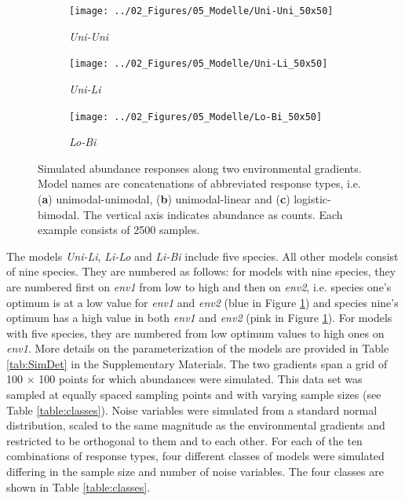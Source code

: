 	
		\begin{figure}[h!]
			
			\begin{subfigure}{0.3\textwidth}
				\centering
				\texttt{[image: ../02\_Figures/05\_Modelle/Uni-Uni\_50x50]}
				\caption{\textit{Uni-Uni}}
				\label{fig:bivariateExample1}
			\end{subfigure}
			\begin{subfigure}{0.3\textwidth}
				\centering
				\texttt{[image: ../02\_Figures/05\_Modelle/Uni-Li\_50x50]}
				\caption{\textit{Uni-Li}}
			\end{subfigure}
			\begin{subfigure}{0.3\textwidth}
				\centering
				\texttt{[image: ../02\_Figures/05\_Modelle/Lo-Bi\_50x50]}
				\caption{\textit{Lo-Bi}}
				\label{fig:bivariateExample3}
			\end{subfigure}
			\caption{Simulated abundance responses along two environmental gradients. Model names are concatenations of abbreviated response types, i.e. (\textbf{a}) unimodal-unimodal, (\textbf{b}) unimodal-linear and (\textbf{c}) logistic-bimodal. The vertical axis indicates abundance as counts.
				Each example consists of 2500 samples.}
			\label{fig:bivariateExample}
		\end{figure}
	
		
		The models \textit{Uni-Li}, \textit{Li-Lo} and \textit{Li-Bi} include five species.
		All other models consist of nine species.
		They are numbered as follows: for models with nine species, they are numbered first on \textit{env1} from low to high and then on \textit{env2}, i.e. species one's optimum is at a low value for \textit{env1} and \textit{env2} (blue in Figure \ref{fig:bivariateExample1}) and species nine's optimum has a high value in both \textit{env1} and \textit{env2} (pink in Figure \ref{fig:bivariateExample1}). 
		For models with five species, they are numbered from low optimum values to high ones on \textit{env1}.
		More details on the parameterization of the models are provided in Table \ref{tab:SimDet} in the Supplementary Materials.
		The two gradients span a grid of 100 $\times$ 100 points for which abundances were simulated. 
		This data set was sampled at equally spaced sampling points and with varying sample sizes (see Table \ref{table:classes}). 
		Noise variables were simulated from a standard normal distribution, scaled to the same magnitude as the environmental gradients and restricted to be orthogonal to them and to each other.  
		For each of the ten combinations of response types, four different classes of models were simulated differing in the sample size and number of noise variables. 
		The four classes are shown in Table \ref{table:classes}. 
	
